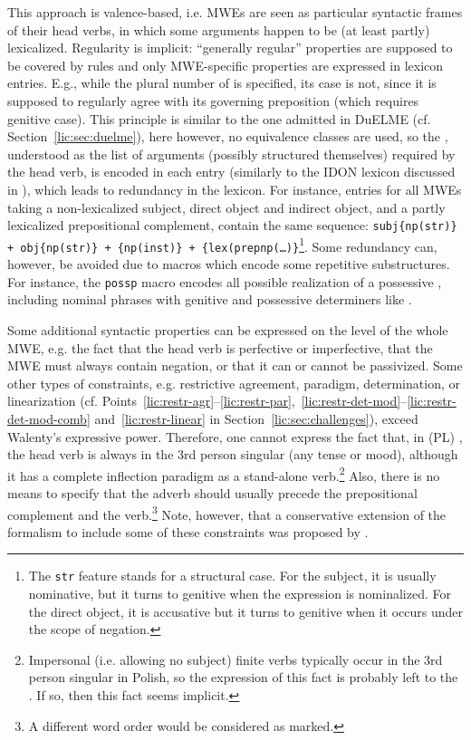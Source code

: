 \documentclass[output=paper
,modfonts
,nonflat
,biblatexbackend=biber
]{langsci/langscibook}
\begin{document}
This approach is valence-based, i.e. MWEs are seen as particular syntactic frames of their head verbs, in which some arguments happen to be (at least partly) lexicalized. Regularity is implicit: ``generally regular'' properties are supposed to be covered by  rules and only MWE-specific properties are expressed in lexicon entries. E.g., while the plural number of  is specified, its case is not, since it is supposed to regularly agree with its governing preposition (which requires genitive case). This principle is similar to the one admitted in DuELME (cf. Section~\ref{lic:sec:duelme}), here however, no equivalence classes are used, so the , understood as the list of arguments (possibly structured themselves) required by the head verb, is encoded in each entry (similarly to the IDON lexicon discussed in ), which leads to redundancy in the lexicon. For instance, entries for all MWEs taking a non-lexicalized subject, direct object and indirect object, and a partly lexicalized prepositional complement, contain the same sequence: \texttt{subj\{np(str)\} + obj\{np(str)\} + \{np(inst)\} + \{lex(prepnp(\ldots)\}}\footnote{The \texttt{str} feature stands for a structural case. For the subject, it is usually nominative, but it turns to genitive when the expression is nominalized. For the direct object, it is accusative but it turns to genitive when it occurs under the scope of negation.}. Some redundancy can, however, be avoided due to macros which encode some repetitive substructures. For instance, the \texttt{possp} macro encodes all possible realization of a possessive , including nominal phrases with genitive and possessive determiners like .

Some additional syntactic properties can be expressed on the level of the whole MWE, e.g. the fact that the head verb is perfective or imperfective, that the MWE must always contain negation, or that it can or cannot be passivized. Some other types of constraints, e.g. restrictive agreement, paradigm, determination, or linearization (cf. Points~\ref{lic:restr-agr}--\ref{lic:restr-par},~\ref{lic:restr-det-mod}--\ref{lic:restr-det-mod-comb} and~\ref{lic:restr-linear} in Section~\ref{lic:sec:challenges}), exceed Walenty's expressive power. Therefore, one cannot express the fact that, in (PL) , the head verb  is always in the 3rd person singular (any tense or mood), although it has a complete inflection paradigm as a stand-alone verb.\footnote{Impersonal (i.e. allowing no subject) finite verbs typically occur in the 3rd person singular in Polish, so the expression of this fact is probably left to the . If so, then this fact seems implicit.} 
Also, there is no means to specify that the adverb  should usually precede the prepositional complement and the verb.\footnote{A different word order would be considered as marked.} 
Note, however, that a conservative extension of the formalism to include some of these constraints was proposed by \cite{prz:etal:16}.
\end{document}
